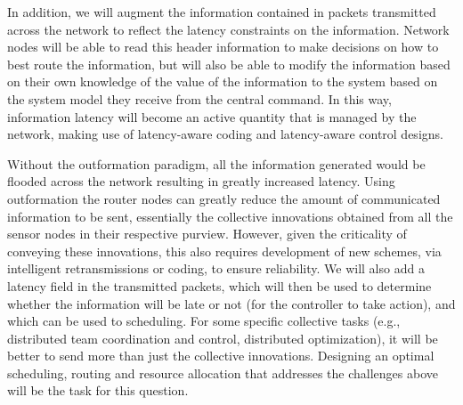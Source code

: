 \documentclass[12pt,letterpaper]{article}
\begin{document}
In addition, we will augment the information contained in packets transmitted across the network to reflect the latency constraints on the information. Network nodes will be able to read this header information to make decisions on how to best route the information, but will also be able to modify the information based on their own knowledge of the value of the information to the system based on the system model they receive from the central command. In this way, information latency will become an active quantity that is managed by the network, making use of latency-aware coding and latency-aware control designs.

Without the outformation paradigm, all the information generated would be flooded across the network resulting in greatly increased latency. Using outformation the router nodes can greatly reduce the amount of communicated information to be sent, essentially the collective innovations obtained from all the sensor nodes in their respective purview. However, given the criticality of conveying these innovations, this also requires development of new schemes, via intelligent retransmissions or coding, to ensure reliability. We will also add a latency field in the transmitted packets, which will then be used to determine whether the information will be late or not (for the controller to take action), and which can be used to scheduling. For some specific collective tasks (e.g., distributed team coordination and control, distributed optimization), it will be better to send more than just the collective innovations. Designing an optimal scheduling, routing and resource allocation that addresses the challenges above will be the task for this question.
\end{document}
